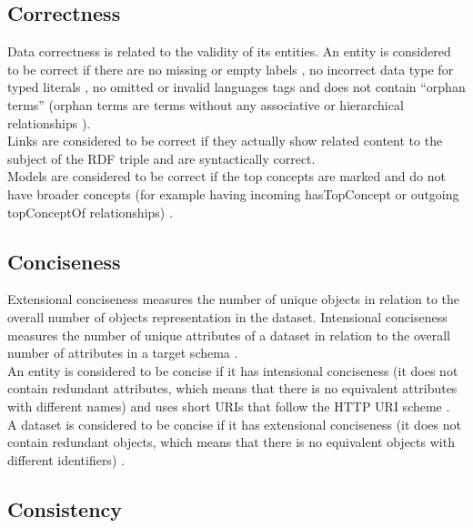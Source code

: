 \documentclass[onecolumn, crcready]{iosart2c}
\begin{document}
\subsection{Correctness}

Data correctness is related to the validity of its entities. An entity is considered to be correct if there are no missing or empty labels \cite{Acosta2013}\cite{Mader2012}, no incorrect data type for typed literals \cite{Hogan2010}\cite{Acosta2013}, no omitted or invalid languages tags \cite{Suominen:2012:IQS:2413941.2413985}\cite{Mader2012} and does not contain ``orphan terms'' (orphan terms are terms without any associative or hierarchical relationships \cite{journals/ires/Living10}).\\ Links are considered to be correct if they actually show related content to the subject of the RDF triple \cite{Suominen:2012:IQS:2413941.2413985}\cite{Acosta2013} and are syntactically correct. \\ Models are considered to be correct if the top concepts are marked and do not have broader concepts (for example having incoming hasTopConcept or outgoing topConceptOf relationships) \cite{Mader2012}.

\subsection{Conciseness}

Extensional conciseness measures the number of unique objects in relation to the overall number of objects representation in the dataset. Intensional conciseness measures the number of unique attributes of a dataset in relation to the overall number of attributes in a target schema \cite{ Bleiholder:2009}. \\ An entity is considered to be concise if it has intensional conciseness (it does not contain redundant attributes, which means that there is no equivalent attributes with different names) \cite{Mendes2012} and uses short URIs \cite{Framework2012} that follow the HTTP URI scheme \cite{Hogan:2012:ESL:2263498.2264570}\cite{Suominen2013}.\\ A dataset is considered to be concise if it has extensional conciseness (it does not contain redundant objects, which means that there is no equivalent objects with different identifiers) \cite{Mendes2012}.

\subsection{Consistency}
\end{document}
